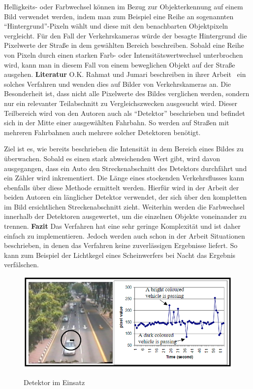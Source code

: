 Helligkeits- oder Farbwechsel können im Bezug zur Objekterkennung auf einem Bild verwendet werden, indem man zum Beispiel eine Reihe an sogenannten "`Hintergrund"'-Pixeln wählt und diese mit den benachbarten Objektpixeln vergleicht.
Für den Fall der Verkehrskameras würde der besagte Hintergrund die Pixelwerte der Straße in dem gewählten Bereich beschreiben.
Sobald eine Reihe von Pixeln durch einen starken Farb- oder Intensitätswertwechsel unterbrochen wird, kann man in diesem Fall von einem beweglichen Objekt auf der Straße ausgehen.\newline\newline
\textbf{Literatur}\newline
O.K. Rahmat und Jumari beschreiben in ihrer Arbeit~\cite{bin2001vehicle} ein solches Verfahren und wenden dies auf Bilder von Verkehrskameras an. 
Die Besonderheit ist, dass nicht alle Pixelwerte des Bildes verglichen werden, sondern nur ein relevanter Teilabschnitt zu Vergleichszwecken ausgesucht wird. 
Dieser Teilbereich wird von den Autoren auch als "`Detektor"' beschrieben und befindet sich in der Mitte einer ausgewählten Fahrbahn. 
So werden auf Straßen mit mehreren Fahrbahnen auch mehrere solcher Detektoren benötigt.

Ziel ist es, wie bereits beschrieben die Intensität in dem Bereich eines Bildes zu überwachen. 
Sobald es einen stark abweichenden Wert gibt, wird davon ausgegangen, dass ein Auto den Streckenabschnitt des Detektors durchfährt und ein Zähler wird inkrementiert.
Die Länge eines stockenden Verkehrsflusses kann ebenfalls über diese Methode ermittelt werden. 
Hierfür wird in der Arbeit der beiden Autoren ein länglicher Detektor verwendet, der sich über den kompletten im Bild ersichtlichen Streckenabschnitt zieht.
Weiterhin werden die Farbwechsel innerhalb der Detektoren ausgewertet, um die einzelnen Objekte voneinander zu trennen.
\newline\newline
\textbf{Fazit}\newline
Das Verfahren hat eine sehr geringe Komplexität und ist daher einfach zu implementieren. Jedoch werden auch schon in der Arbeit Situationen beschrieben, in denen das Verfahren keine zuverlässigen Ergebnisse liefert. 
So kann zum Beispiel der Lichtkegel eines Scheinwerfers bei Nacht das Ergebnis verfälschen.
\begin{figure}[ht]
   \centering
     \includegraphics[width=15cm]{Bilder/pixelanalysis} \\
 \caption{Detektor im Einsatz}
 \label{fig:Pixelanalysis}
\end{figure}
\newpage
